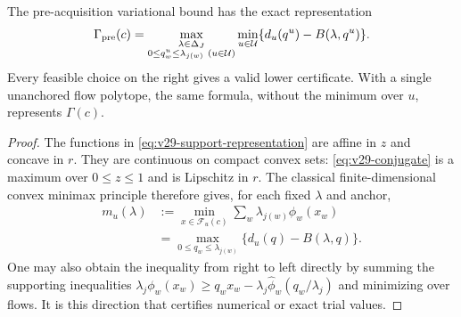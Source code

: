\begin{theorem}\label{thm:v29-dual}
The pre-acquisition variational bound has the exact representation
\begin{equation}\label{eq:v29-dual}
 \Gamma_{\rm pre}(c)=
 \max_{\substack{\lambda\in\Delta_J\\
              0\le q^u_w\le\lambda_{j(w)}\ (u\in\mathcal U)}}
       \min_{u\in\mathcal U}\{d_u(q^u)-B(\lambda,q^u)\}.
\end{equation}
Every feasible choice on the right gives a valid lower certificate.
With a single unanchored flow polytope, the same formula, without the
minimum over $u$, represents $\Gamma(c)$.
\end{theorem}
\begin{proof}
The functions in \eqref{eq:v29-support-representation} are affine in
$z$ and concave in $r$. They are continuous on compact convex sets:
\eqref{eq:v29-conjugate} is a maximum over $0\le z\le1$ and is
Lipschitz in $r$. The classical finite-dimensional convex minimax principle
\cite{Rockafellar1964} therefore gives,
for each fixed $\lambda$ and anchor,
\begin{equation}\label{eq:v29-inner-dual}
 \begin{split}
 m_u(\lambda)
  &:=\min_{x\in\mathcal F_u(c)}\sum_w\lambda_{j(w)}\phi_w(x_w)\\
  &=\max_{0\le q_w\le\lambda_{j(w)}}
                          \{d_u(q)-B(\lambda,q)\}.
 \end{split}
\end{equation}
One may also obtain the inequality from right to left directly by
summing the supporting inequalities
$\lambda_j\phi_w(x_w)\ge q_wx_w-
\lambda_j\widehat\phi_w(q_w/\lambda_j)$ and minimizing over flows.
It is this direction that certifies numerical or exact trial values.


\end{proof}
